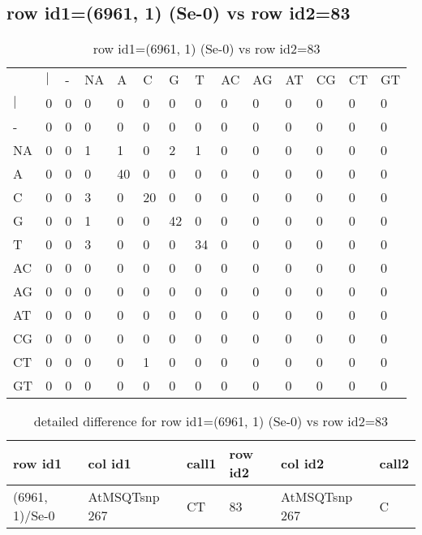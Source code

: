 \subsection{row id1=(6961, 1) (Se-0) vs row id2=83}
\begin{center}
\begin{longtable}{|l|l|l|l|l|l|l|l|l|l|l|l|l|l|}
\caption{row id1=(6961, 1) (Se-0) vs row id2=83} \label{table_dm166}\\
\hline
\\
\hline
&$|$&-&NA&A&C&G&T&AC&AG&AT&CG&CT&GT\\
$|$&0&0&0&0&0&0&0&0&0&0&0&0&0\\
-&0&0&0&0&0&0&0&0&0&0&0&0&0\\
NA&0&0&1&1&0&2&1&0&0&0&0&0&0\\
A&0&0&0&40&0&0&0&0&0&0&0&0&0\\
C&0&0&3&0&20&0&0&0&0&0&0&0&0\\
G&0&0&1&0&0&42&0&0&0&0&0&0&0\\
T&0&0&3&0&0&0&34&0&0&0&0&0&0\\
AC&0&0&0&0&0&0&0&0&0&0&0&0&0\\
AG&0&0&0&0&0&0&0&0&0&0&0&0&0\\
AT&0&0&0&0&0&0&0&0&0&0&0&0&0\\
CG&0&0&0&0&0&0&0&0&0&0&0&0&0\\
CT&0&0&0&0&1&0&0&0&0&0&0&0&0\\
GT&0&0&0&0&0&0&0&0&0&0&0&0&0\\
\hline
\end{longtable}
\end{center}

\begin{center}
\begin{longtable}{|l|l|l|l|l|l|}
\caption{detailed difference for row id1=(6961, 1) (Se-0) vs row id2=83} \label{table_dm167}\\
\hline
row id1&col id1&call1&row id2&col id2&call2\\
\hline
(6961, 1)/Se-0&AtMSQTsnp 267&CT&83&AtMSQTsnp 267&C\\
\hline
\end{longtable}
\end{center}

